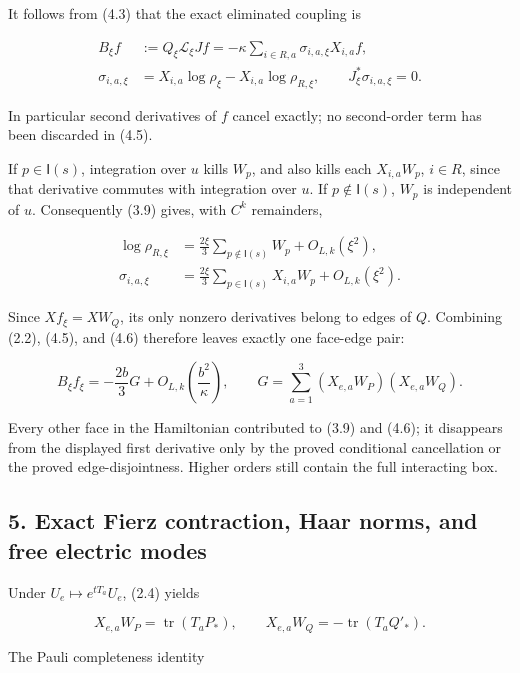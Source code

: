 It follows from (4.3) that the exact eliminated coupling is

\[
\begin{split}
B_\xi f&:=Q_\xi\mathscr L_\xi Jf
 =-\kappa\sum_{i\in R,a}\sigma_{i,a,\xi}X_{i,a}f,\\
\sigma_{i,a,\xi}&=X_{i,a}\log\rho_\xi-X_{i,a}\log\rho_{R,\xi},
\qquad J_\xi^*\sigma_{i,a,\xi}=0.
\end{split}
\tag{4.5}
\]

In particular second derivatives of \(f\) cancel exactly; no
second-order term has been discarded in (4.5).

If \(p\in\mathsf I(s)\), integration over \(u\) kills \(W_p\), and also
kills each \(X_{i,a}W_p\), \(i\in R\), since that derivative commutes
with integration over \(u\). If \(p\notin\mathsf I(s)\), \(W_p\) is
independent of \(u\). Consequently (3.9) gives, with \(C^k\) remainders,

\[
\begin{split}
\log\rho_{R,\xi}
 &=\frac{2\xi}{3}\sum_{p\notin\mathsf I(s)}W_p+O_{L,k}(\xi^2),\\
\sigma_{i,a,\xi}
 &=\frac{2\xi}{3}\sum_{p\in\mathsf I(s)}X_{i,a}W_p
   +O_{L,k}(\xi^2).
\end{split}
\tag{4.6}
\]

Since \(Xf_\xi=XW_Q\), its only nonzero derivatives belong to edges of
\(Q\). Combining (2.2), (4.5), and (4.6) therefore leaves exactly one
face-edge pair:

\[
B_\xi f_\xi=-\frac{2b}{3}G+O_{L,k}\!\left(\frac{b^2}{\kappa}\right),
\qquad G=\sum_{a=1}^3(X_{e,a}W_P)(X_{e,a}W_Q).
\tag{4.7}
\]

Every other face in the Hamiltonian contributed to (3.9) and (4.6); it
disappears from the displayed first derivative only by the proved
conditional cancellation or the proved edge-disjointness. Higher orders
still contain the full interacting box.

\subsection{5. Exact Fierz contraction, Haar norms, and free electric
modes}\label{bulk-exact-fierz-contraction-haar-norms-and-free-electric-modes}

Under \(U_e\mapsto e^{tT_a}U_e\), (2.4) yields

\[
X_{e,a}W_P=\operatorname{tr}(T_aP_*),\qquad
X_{e,a}W_Q=-\operatorname{tr}(T_aQ'_*).
\tag{5.1}
\]

The Pauli completeness identity

